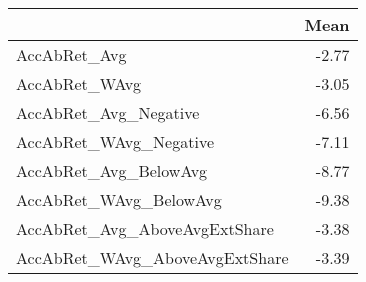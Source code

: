 \begin{tabular}{lr}
\toprule
 & Mean \\
\midrule
AccAbRet\_Avg & -2.77 \\
AccAbRet\_WAvg & -3.05 \\
AccAbRet\_Avg\_Negative & -6.56 \\
AccAbRet\_WAvg\_Negative & -7.11 \\
AccAbRet\_Avg\_BelowAvg & -8.77 \\
AccAbRet\_WAvg\_BelowAvg & -9.38 \\
AccAbRet\_Avg\_AboveAvgExtShare & -3.38 \\
AccAbRet\_WAvg\_AboveAvgExtShare & -3.39 \\
\bottomrule
\end{tabular}
